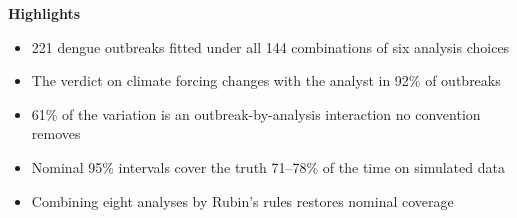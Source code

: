 \documentclass[11pt]{article}
\begin{document}
\textbf{Highlights}

\begin{itemize}
  \item 221 dengue outbreaks fitted under all 144 combinations of six analysis choices
  \item The verdict on climate forcing changes with the analyst in 92\% of outbreaks
  \item 61\% of the variation is an outbreak-by-analysis interaction no convention removes
  \item Nominal 95\% intervals cover the truth 71--78\% of the time on simulated data
  \item Combining eight analyses by Rubin's rules restores nominal coverage
\end{itemize}
\end{document}
